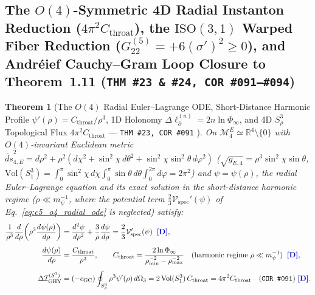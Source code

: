 \documentclass[11pt,a4paper]{article}
\newcommand{\catD}{\text{\textbf{\textcolor{blue!75!black}{[D]}}}}
\theoremstyle{definition}
\theoremstyle{plain}
\newtheorem{theorem}[axiom]{Theorem}
\theoremstyle{remark}
\begin{document}
\subsection{The $O(4)$-Symmetric 4D Radial Instanton Reduction ($4\pi^2 C_{\mathrm{throat}}$), the $\mathrm{ISO}(3,1)$ Warped Fiber Reduction ($G_{22}^{(5)} = +6(\sigma')^2 \ge 0$), and Andr\'eief Cauchy--Gram Loop Closure to Theorem~1.11 (\texttt{THM~\#23 \& \#24, COR~\#091--\#094})}

\begin{theorem}[{The $O(4)$ Radial Euler--Lagrange ODE, Short-Distance Harmonic Profile $\psi'(\rho) = C_{\mathrm{throat}}/\rho^3$, 1D Holonomy $\Delta\ell_\partial^{(n)} = 2n\ln\Phi_\infty$, and 4D $S^3_\rho$ Topological Flux $4\pi^2 C_{\mathrm{throat}}$ --- \texttt{THM~\#23, COR~\#091} \catD}]\label{thm:c5_o4_instanton}\label{thm:c5_o4_instanton_ode}
On $\mathcal{M}_4^E \simeq \mathbb{R}^4\setminus\{0\}$ with $O(4)$-invariant Euclidean metric $\widetilde{ds}_{4,E}^2 = d\rho^2 + \rho^2(d\chi^2 + \sin^2\chi\,d\theta^2 + \sin^2\chi\sin^2\theta\,d\varphi^2)$ ($\sqrt{g_{E,4}} = \rho^3\sin^2\chi\sin\theta$, $\mathrm{Vol}(S^3_1) = \int_0^\pi\sin^2\chi\,d\chi\int_0^\pi\sin\theta\,d\theta\int_0^{2\pi}d\varphi = 2\pi^2$) and $\psi = \psi(\rho)$, the radial Euler--Lagrange equation and its exact solution in the short-distance harmonic regime ($\rho \ll m_\psi^{-1}$, where the potential term $\frac{2}{3}\mathcal{V}_{\mathrm{spec}}'(\psi)$ of Eq.~\eqref{eq:c5_o4_radial_ode} is neglected) satisfy:
\begin{align}
\frac{1}{\rho^3}\frac{d}{d\rho}\!\left(\rho^3\frac{d\psi(\rho)}{d\rho}\right) &= \frac{d^2\psi}{d\rho^2} + \frac{3}{\rho}\frac{d\psi}{d\rho} = \frac{2}{3}\mathcal{V}_{\mathrm{spec}}'(\psi) \;\;\catD, \label{eq:c5_o4_radial_ode} \\[4pt]
\frac{d\psi(\rho)}{d\rho} &= \frac{C_{\mathrm{throat}}}{\rho^3}, \qquad
C_{\mathrm{throat}} = \frac{2\ln\Phi_\infty}{\rho_{\min}^{-2} - \rho_{\max}^{-2}} \quad (\textnormal{harmonic regime }\rho \ll m_\psi^{-1}) \;\;\catD, \nonumber \\[4pt]
\Delta\mathcal{I}_{\mathrm{GHY}}^{(S^3)} &= (-c_{\mathrm{GC}})\oint_{S^3_\rho}\rho^3\psi'(\rho)\,d\Omega_3 = 2\,\mathrm{Vol}(S^3_1)\,C_{\mathrm{throat}} = 4\pi^2 C_{\mathrm{throat}} \quad \textnormal{(\texttt{COR~\#091})} \;\catD. \label{eq:c5_o4_s3_flux}
\end{align}
\end{theorem}
\end{document}
